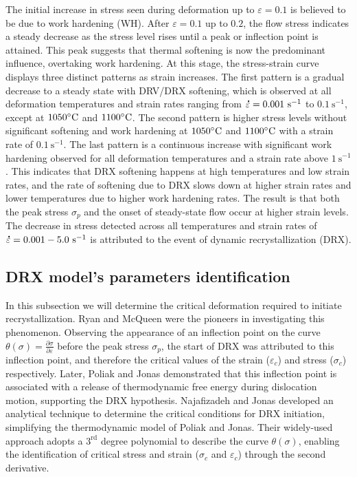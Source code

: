\documentclass[metals,article,submit,pdftex,moreauthors]{Definitions/mdpi}
\DeclareRobustCommand{\mdot}[1]{\accentset{\mbox{\bfseries .}}{#1}}
\DeclareRobustCommand{\ps}{\text{s}^{-1}}
\begin{document}
The initial increase in stress seen during deformation up to $\varepsilon=0.1$ is believed to be due to work hardening (WH).
After $\varepsilon=0.1$ up to $0.2$, the flow stress indicates a steady decrease as the stress level rises until a peak or inflection point is attained.
This peak suggests that thermal softening is now the predominant influence, overtaking work hardening.
At this stage, the stress-strain curve displays three distinct patterns as strain increases.
The first pattern is a gradual decrease to a steady state with DRV/DRX softening, which is observed at all deformation temperatures and strain rates ranging from $\mdot\varepsilon=0.001~\ps$ to $0.1~\ps$, except at $1050\celsius$ and $1100\celsius$.
The second pattern is higher stress levels without significant softening and work hardening at $1050\celsius$ and $1100\celsius$ with a strain rate of $0.1~\ps$.
The last pattern is a continuous increase with significant work hardening observed for all deformation temperatures and a strain rate above $1~\ps$.
This indicates that DRX softening happens at high temperatures and low strain rates,
and the rate of softening due to DRX slows down at higher strain rates and lower temperatures due to higher work hardening rates.
The result is that both the peak stress $\sigma_p$ and the onset of steady-state flow occur at higher strain levels.
The decrease in stress detected across all temperatures and strain rates of $\mdot\varepsilon=0.001-5.0~\ps$ is attributed to the event of dynamic recrystallization (DRX).

\subsection{DRX model's parameters identification\label{subsec:DRXParameters}}

In this subsection we will determine the critical deformation required to initiate recrystallization.
Ryan and McQueen \cite{Ryan-1989, Ryan-1990, Ryan-1990-2} were the pioneers in investigating this phenomenon.
Observing the appearance of an inflection point on the curve $\theta(\sigma)=\frac{\partial \sigma}{\partial \varepsilon}$ before the peak stress $\sigma_p$, the start of DRX was attributed to this inflection point, and therefore the critical values of the strain ($\varepsilon_c$) and stress ($\sigma_c$) respectively.
Later, Poliak and Jonas \cite{Poliak-1996, Poliak-2003, Poliak-2003-2, Jonas-2003} demonstrated that this inflection point is associated with a release of thermodynamic free energy during dislocation motion, supporting the DRX hypothesis.
Najafizadeh and Jonas \cite{Najafizadeh-2006} developed an analytical technique to determine the critical conditions for DRX initiation, simplifying the thermodynamic model of Poliak and Jonas.
Their widely-used approach adopts a $3^\text{rd}$ degree polynomial to describe the curve $\theta(\sigma)$, enabling the identification of critical stress and strain ($\sigma_c$ and $\varepsilon_c$) through the second derivative.
\end{document}

